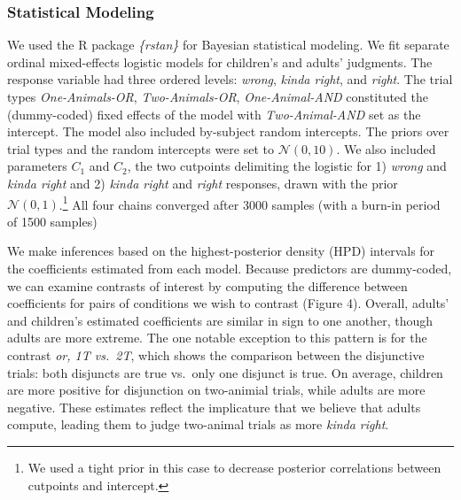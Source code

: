 \documentclass[10pt, letterpaper]{article}
\begin{document}
\subsubsection{Statistical Modeling}\label{statistical-modeling}

We used the R package \emph{\{rstan\}} for Bayesian statistical
modeling. We fit separate ordinal mixed-effects logistic models for
children's and adults' judgments. The response variable had three
ordered levels: \emph{wrong}, \emph{kinda right}, and \emph{right}. The
trial types \emph{One-Animals-OR}, \emph{Two-Animals-OR},
\emph{One-Animal-AND} constituted the (dummy-coded) fixed effects of the
model with \emph{Two-Animal-AND} set as the intercept. The model also
included by-subject random intercepts. The priors over trial types and
the random intercepts were set to \(\mathcal{N}(0,10)\). We also
included parameters \(C_1\) and \(C_2\), the two cutpoints delimiting
the logistic for 1) \emph{wrong} and \emph{kinda right} and 2)
\emph{kinda right} and \emph{right} responses, drawn with the prior
\(\mathcal{N}(0,1)\).\footnote{We used a tight prior in this case to
  decrease posterior correlations between cutpoints and intercept.} All
four chains converged after 3000 samples (with a burn-in period of 1500
samples)

We make inferences based on the highest-posterior density (HPD)
intervals for the coefficients estimated from each model. Because
predictors are dummy-coded, we can examine contrasts of interest by
computing the difference between coefficients for pairs of conditions we
wish to contrast (Figure 4). Overall, adults' and children's estimated
coefficients are similar in sign to one another, though adults are more
extreme. The one notable exception to this pattern is for the contrast
\emph{or, 1T vs.~2T}, which shows the comparison between the disjunctive
trials: both disjuncts are true vs.~only one disjunct is true. On
average, children are more positive for disjunction on two-animial
trials, while adults are more negative. These estimates reflect the
implicature that we believe that adults compute, leading them to judge
two-animal trials as more \emph{kinda right}.
\end{document}
